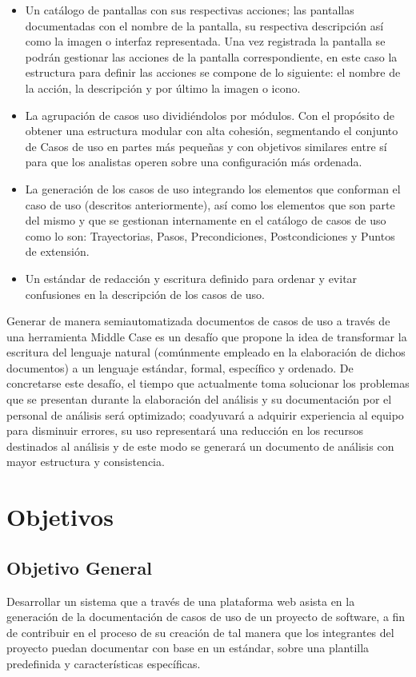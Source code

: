 \begin{itemize}
	\item Un catálogo de pantallas con sus respectivas acciones; las pantallas documentadas con el nombre de la pantalla, su respectiva descripción así como la imagen o interfaz representada. Una vez registrada la pantalla se podrán gestionar las acciones de la pantalla correspondiente, en este caso la estructura para definir las acciones se compone de lo siguiente: el nombre de la acción, la descripción y por último la imagen o icono.
	\item La agrupación de casos uso dividiéndolos por módulos. Con el propósito de obtener una estructura modular con alta cohesión, segmentando el conjunto de Casos de uso en partes más pequeñas y con objetivos similares entre sí para que los analistas operen sobre una configuración más ordenada.
	\item La generación de los casos de uso integrando los elementos que conforman el caso de uso (descritos anteriormente), así como los elementos que son parte del mismo y que se gestionan internamente en el catálogo de casos de uso como lo son: Trayectorias, Pasos, Precondiciones, Postcondiciones y Puntos de extensión.
	\item Un estándar de redacción y escritura definido para ordenar y evitar confusiones en la descripción de los casos de uso.
\end{itemize}
	
Generar de manera semiautomatizada documentos de casos de uso a través de una herramienta Middle Case es un desafío que propone la idea de transformar la escritura del lenguaje natural (comúnmente empleado en la elaboración de dichos documentos) a un lenguaje estándar, formal, específico y ordenado. De concretarse este desafío, el tiempo que actualmente toma solucionar los problemas que se presentan durante la elaboración del análisis y su documentación por el personal de análisis será optimizado; coadyuvará a adquirir experiencia al equipo para disminuir errores, su uso representará una reducción en los recursos destinados al análisis y de este modo se generará un documento de análisis con mayor estructura y consistencia.

\section{Objetivos}
\subsection{Objetivo General}
Desarrollar un sistema que a través de una plataforma web asista en la generación de la documentación de casos de uso de un proyecto de software, a fin de contribuir en el proceso de su creación de tal manera que los integrantes del proyecto puedan documentar con base en un estándar, sobre una plantilla predefinida y características específicas.

